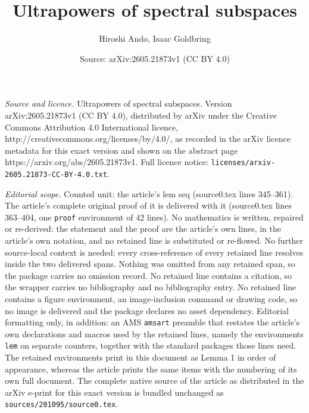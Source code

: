 \documentclass[10pt,a4paper]{amsart}
\title{Ultrapowers of spectral subspaces}
\author{Hiroshi Ando, Isaac Goldbring}
\date{Source: arXiv:2605.21873v1 (CC BY 4.0)}
\begin{document}
\maketitle

\noindent\emph{Source and licence.} Ultrapowers of spectral subspaces. Version arXiv:2605.21873v1 (CC BY 4.0), distributed by arXiv under the Creative Commons Attribution 4.0 International licence, http://creativecommons.org/licenses/by/4.0/, as recorded in the arXiv licence metadata for this exact version and shown on the abstract page https://arxiv.org/abs/2605.21873v1. Full licence notice: \texttt{licenses/arxiv-2605.21873-CC-BY-4.0.txt}.\par\smallskip

\noindent\textit{Editorial scope.} Counted unit: the article's lem seq (source0.tex lines 345--361). The article's complete original proof of it is delivered with it (source0.tex lines 363--404, one \texttt{proof} environment of 42 lines). No mathematics is written, repaired or re-derived: the statement and the proof are the article's own lines, in the article's own notation, and no retained line is substituted or re-flowed.  No further source-local context is needed: every cross-reference of every retained line resolves inside the two delivered spans.  Nothing was omitted from any retained span, so the package carries no omission record.  No retained line contains a citation, so the wrapper carries no bibliography and no bibliography entry.  No retained line contains a figure environment, an image-inclusion command or drawing code, so no image is delivered and the package declares no asset dependency.  Editorial formatting only, in addition: an AMS \texttt{amsart} preamble that restates the article's own declarations and macros used by the retained lines, namely the environments \texttt{lem} on separate counters, together with the standard packages those lines need.  The retained environments print in this document as Lemma 1 in order of appearance, whereas the article prints the same items with the numbering of its own full document.  The complete native source of the article as distributed in the arXiv e-print for this exact version is bundled unchanged as \texttt{sources/201095/source0.tex}.
\end{document}
